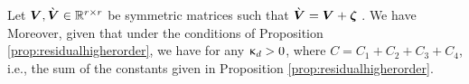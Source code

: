 \begin{proposition}
\label{prop:monotoneresidual}
Let $\boldsymbol{V},  \grave{\boldsymbol{V}}\in \mathbb{R}^{r \times r}$ be symmetric matrices such that  $\grave{\boldsymbol{V}} =  \boldsymbol{V} +  \boldsymbol{\zeta}$ .  We have
Moreover,  given that
under the conditions of  Proposition \ref{prop:residualhigherorder}, we have for any $\upkappa_d > 0$,
where $C = C_1 + C_2 + C_3 + C_4$, i.e., the sum of the constants given in   Proposition \ref{prop:residualhigherorder}.
\end{proposition}

